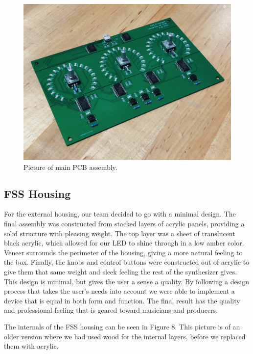 \documentclass[conference]{IEEEtran}
\begin{document}
\begin{figure}[bhtp]
    \centering
    \includegraphics[width=5in]{./resources/figures/main_pcb_assembly.jpg}
    \caption{Picture of main PCB assembly.}
    \label{fig:main_pcb_assembly}
\end{figure}

\subsection{FSS Housing}
For the external housing, our team decided to go with a minimal design. The final assembly was constructed from stacked layers of acrylic panels, providing a solid structure with pleasing weight. The top layer was a sheet of translucent black acrylic, which allowed for our LED to shine through in a low amber color. Veneer surrounds the perimeter of the housing, giving a more natural feeling to the box. Finally, the knobs and control buttons were constructed out of acrylic to give them that same weight and sleek feeling the rest of the synthesizer gives. This design is minimal, but gives the user a sense a quality. By following a design process that takes the user's needs into account we were able to implement a device that is equal in both form and function. The final result has the quality and professional feeling that is geared toward musicians and producers.

The internals of the FSS housing can be seen in Figure 8. This picture is of an older version where we had used wood for the internal layers, before we replaced them with acrylic.
\end{document}
